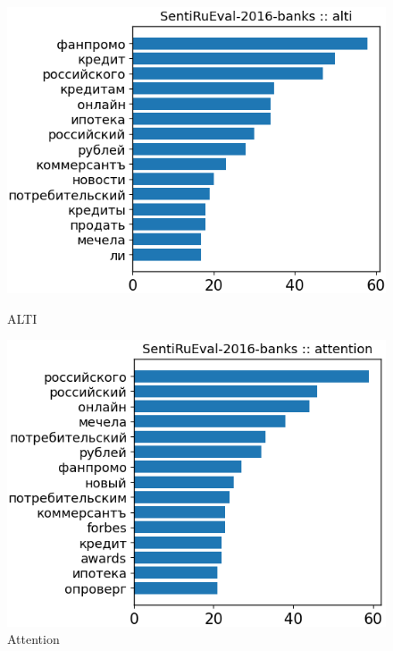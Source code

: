 \begin{figure}[H]
\centering
\begin{minipage}[b]{0.49\textwidth}
\centering
\includegraphics[width=\textwidth]{pictures/examples_banks/dict1.png} %
\caption{ALTI}
\end{minipage}
\hfill
\begin{minipage}[b]{0.49\textwidth}
\centering
\includegraphics[width=\textwidth]{pictures/examples_banks/dict2.png} %
\caption{Attention}
\end{minipage}
\end{figure}

